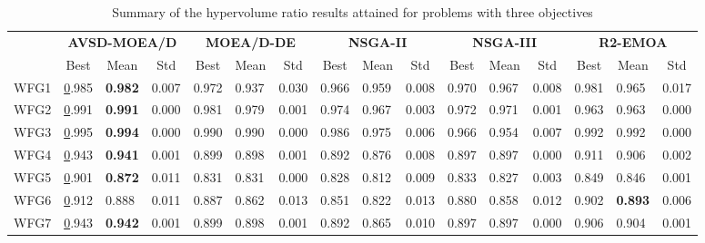 \begin{table*}[t]
\caption{Summary of the hypervolume ratio results attained for problems with three objectives}
\label{tab:StatisticsHV_3obj}
\centering
\begin{scriptsize}
\begin{tabular}{c l|l|l|l|l|l|l|l|l|l|l|l|l|l|l}
\cline{2-16}
 & \multicolumn{3}{c|}{\textbf{AVSD-MOEA/D}} & \multicolumn{3}{c|}{\textbf{MOEA/D-DE}} & \multicolumn{3}{c|}{\textbf{NSGA-II}} & \multicolumn{3}{c|}{\textbf{NSGA-III}} & \multicolumn{3}{c}{\textbf{R2-EMOA}} \\ \cline{2-16} 
 & \multicolumn{1}{c|}{Best} & \multicolumn{1}{c|}{Mean} & \multicolumn{1}{c|}{Std} & \multicolumn{1}{c|}{Best} & \multicolumn{1}{c|}{Mean} & \multicolumn{1}{c|}{Std} & \multicolumn{1}{c|}{Best} & \multicolumn{1}{c|}{Mean} & \multicolumn{1}{c|}{Std} & \multicolumn{1}{c|}{Best} & \multicolumn{1}{c|}{Mean} & \multicolumn{1}{c|}{Std} & \multicolumn{1}{c|}{Best} & \multicolumn{1}{c|}{Mean} & \multicolumn{1}{c}{Std} \\ \hline
\multicolumn{1}{c|}{WFG1} & {\ul 0.985} & \textbf{0.982} & 0.007 & 0.972 & 0.937 & 0.030 & 0.966 & 0.959 & 0.008 & 0.970 & 0.967 & 0.008 & 0.981 & 0.965 & 0.017 \\ \hline
\multicolumn{1}{c|}{WFG2} & {\ul 0.991} & \textbf{0.991} & 0.000 & 0.981 & 0.979 & 0.001 & 0.974 & 0.967 & 0.003 & 0.972 & 0.971 & 0.001 & 0.963 & 0.963 & 0.000 \\ \hline
\multicolumn{1}{c|}{WFG3} & {\ul 0.995} & \textbf{0.994} & 0.000 & 0.990 & 0.990 & 0.000 & 0.986 & 0.975 & 0.006 & 0.966 & 0.954 & 0.007 & 0.992 & 0.992 & 0.000 \\ \hline
\multicolumn{1}{c|}{WFG4} & {\ul 0.943} & \textbf{0.941} & 0.001 & 0.899 & 0.898 & 0.001 & 0.892 & 0.876 & 0.008 & 0.897 & 0.897 & 0.000 & 0.911 & 0.906 & 0.002 \\ \hline
\multicolumn{1}{c|}{WFG5} & {\ul 0.901} & \textbf{0.872} & 0.011 & 0.831 & 0.831 & 0.000 & 0.828 & 0.812 & 0.009 & 0.833 & 0.827 & 0.003 & 0.849 & 0.846 & 0.001 \\ \hline
\multicolumn{1}{c|}{WFG6} & {\ul 0.912} & 0.888 & 0.011 & 0.887 & 0.862 & 0.013 & 0.851 & 0.822 & 0.013 & 0.880 & 0.858 & 0.012 & 0.902 & \textbf{0.893} & 0.006 \\ \hline
\multicolumn{1}{c|}{WFG7} & {\ul 0.943} & \textbf{0.942} & 0.001 & 0.899 & 0.898 & 0.001 & 0.892 & 0.865 & 0.010 & 0.897 & 0.897 & 0.000 & 0.906 & 0.904 & 0.001 \\ \hline

\end{tabular}
\end{scriptsize}
\end{table*}
